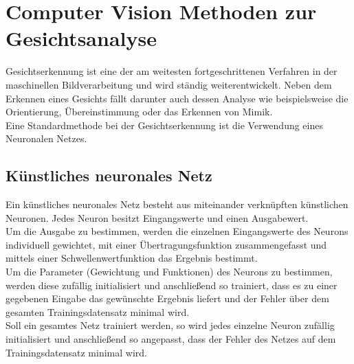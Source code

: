 \section{Computer Vision Methoden zur Gesichtsanalyse}
\label{Grundlagen}
Gesichtserkennung ist eine der am weitesten fortgeschrittenen Verfahren in der maschinellen Bildverarbeitung und wird ständig weiterentwickelt. Neben dem Erkennen eines Gesichts fällt darunter auch dessen Analyse wie beispielsweise die Orientierung, Übereinstimmung oder das Erkennen von Mimik.\\
Eine Standardmethode bei der Gesichtserkennung ist die Verwendung eines Neuronalen Netzes.
\subsection{Künstliches neuronales Netz}
Ein künstliches neuronales Netz besteht aus miteinander verknüpften künstlichen Neuronen. Jedes Neuron besitzt Eingangswerte und einen Ausgabewert.\\
Um die Ausgabe zu bestimmen, werden die einzelnen Eingangswerte des Neurons individuell gewichtet, mit einer Übertragungsfunktion zusammengefasst und mittels einer Schwellenwertfunktion das Ergebnis bestimmt.\\
Um die Parameter (Gewichtung und Funktionen) des Neurons zu bestimmen, werden diese zufällig initialisiert und anschließend so trainiert, dass es zu einer gegebenen Eingabe das gewünschte Ergebnis liefert und der Fehler über dem gesamten Trainingsdatensatz minimal wird.\\
Soll ein gesamtes Netz trainiert werden, so wird jedes einzelne Neuron zufällig initialisiert und anschließend so angepasst, dass der Fehler des Netzes auf dem Trainingsdatensatz minimal wird.
\cite{Maschin_Neuron}
